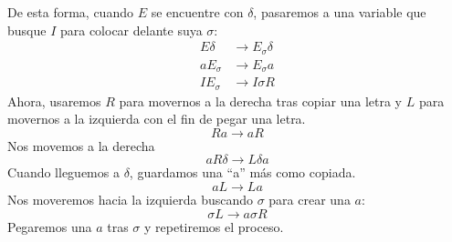 \begin{ejercicio}
\begin{enumerate}
                De esta forma, cuando $E$ se encuentre con $\delta$, pasaremos a una variable que busque $I$ para colocar delante suya $\sigma$:
                \begin{align*}
                    E\delta &\rightarrow E_{\sigma} \delta \\
                    aE_{\sigma} &\rightarrow E_{\sigma} a \\
                    IE_{\sigma} &\rightarrow I\sigma R
                \end{align*}
                Ahora, usaremos $R$ para movernos a la derecha tras copiar una letra y $L$ para movernos a la izquierda con el fin de pegar una letra.
                \begin{equation*}
                    Ra \rightarrow aR 
                \end{equation*}
                Nos movemos a la derecha
                \begin{equation*}
                    aR\delta \rightarrow L\delta a
                \end{equation*}
                Cuando lleguemos a $\delta$, guardamos una ``a'' más como copiada.
                \begin{equation*}
                    aL \rightarrow La
                \end{equation*}
                Nos moveremos hacia la izquierda buscando $\sigma$ para crear una $a$:
                \begin{equation*}
                    \sigma L \rightarrow a \sigma R
                \end{equation*}
                Pegaremos una $a$ tras $\sigma$ y repetiremos el proceso.


\end{enumerate}
\end{ejercicio}

